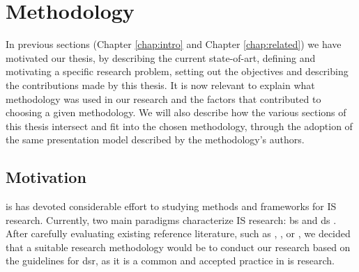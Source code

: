 \chapter{Methodology}

In previous sections (Chapter \ref{chap:intro} and Chapter \ref{chap:related}) we have motivated our thesis, by describing the current state-of-art, defining and motivating a specific research problem, setting out the objectives and describing the contributions made by this thesis. It is now relevant to explain what methodology was used in our research and the factors that contributed to choosing a given methodology. We will also describe how the various sections of this thesis intersect and fit into the chosen methodology, through the adoption of the same presentation model described by the methodology's authors.

\section{Motivation}

\gls{is} has devoted considerable effort to studying methods and frameworks for IS research. Currently, two main paradigms characterize IS research: \gls{bs} and \gls{ds} \cite[76]{hevner_design_2004}. After carefully evaluating existing reference literature, such as \cite{hevner_design_2004}, \cite{march_design_1995}, \cite{winter_design_2008} or \cite{peffers_design_2007}, we decided that a suitable research methodology would be to conduct our research based on the guidelines for \gls{dsr}, as it is a common and accepted practice in \gls{is} research. 

